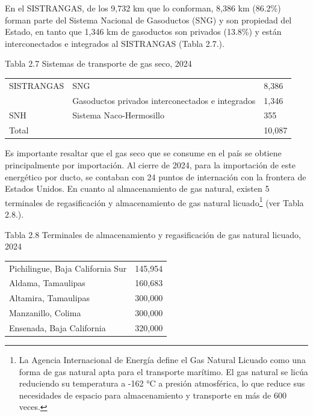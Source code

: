 \documentclass{sener2025}
\begin{document}
En el SISTRANGAS, de los 9,732 km que lo conforman, 8,386 km (86.2\%) forman parte del Sistema Nacional de Gasoductos (SNG) y son propiedad del Estado, en tanto que 1,346 km de gasoductos son privados (13.8\%) y están interconectados e integrados al SISTRANGAS (Tabla 2.7.).

\begin{tabladoradoCorto}
  \caption{Tabla 2.7 Sistemas de transporte de gas seco, 2024}
  \label{tab:tabla_2_7_sistemas_de_transpor}
  \begin{tabularx}{\textwidth}{Vvv}
    \toprule
      &  &  \\
    \midrule
    SISTRANGAS & SNG & 8,386 \\
     & Gasoductos privados interconectados e integrados & 1,346 \\
    SNH & Sistema Naco-Hermosillo & 355 \\
    Total &  & 10,087 \\
    \bottomrule
  \end{tabularx}
\end{tabladoradoCorto}
\vspace{-4pt}


Es importante resaltar que el gas seco que se consume en el país se obtiene principalmente por importación. Al cierre de 2024, para la importación de este energético por ducto, se contaban con 24 puntos de internación con la frontera de Estados Unidos. En cuanto al almacenamiento de gas natural, existen 5 terminales de regasificación y almacenamiento de gas natural licuado\footnote{La Agencia Internacional de Energía define el Gas Natural Licuado como una forma de gas natural apta para el transporte marítimo. El gas natural se licúa reduciendo su temperatura a -162 °C a presión atmosférica, lo que reduce sus necesidades de espacio para almacenamiento y transporte en más de 600 veces.} (ver Tabla 2.8.).

\begin{tabladoradoCorto}
  \caption{Tabla 2.8 Terminales de almacenamiento y regasificación de gas natural licuado, 2024}
  \label{tab:tabla_2_8_terminales_de_almace}
  \begin{tabularx}{\textwidth}{Vv}
    \toprule
      &  \\
    \midrule
    Pichilingue, Baja California Sur & 145,954 \\
    Aldama, Tamaulipas & 160,683 \\
    Altamira, Tamaulipas & 300,000 \\
    Manzanillo, Colima & 300,000 \\
    Ensenada, Baja California & 320,000 \\
    \bottomrule
  \end{tabularx}
\end{tabladoradoCorto}
\vspace{-4pt}
\end{document}
